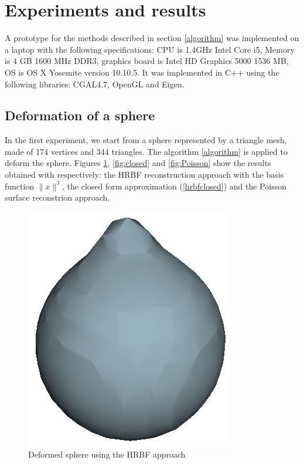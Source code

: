 \documentclass[ams]{U-AizuGT}
\begin{document}
\section{Experiments and results}
A prototype for the methods described in section \ref{algorithm} was implemented on a laptop
with the following specifications: CPU is 1.4GHz Intel Core i5, Memory is 4 GB 1600 MHz DDR3, 
graphics board is Intel HD Graphics 5000 1536 MB, 
OS is OS X Yosemite version 10.10.5. 
It was implemented in C++ using the following libraries: CGAL4.7, OpenGL and Eigen.


\subsection{Deformation of a sphere}

In the first experiment, we start from a sphere represented by a triangle mesh, 
made of 174 vertices and 344 triangles. The algorithm \ref{algorithm} is applied to 
deform the sphere. Figures \ref{fig:hrbf}, \ref{fig:closed} and \ref{fig:Poisson} show 
the results obtained with respectively: the HRBF reconstruction approach with 
the basis function $\|x\|^3$, the closed form approximation (\ref{hrbfclosed}) 
and the Poisson surface reconstrion approach.

\begin{figure}
  \centering\includegraphics[width=0.7\columnwidth]{deformed_sphere_hrbf.jpg}
  \caption{Deformed sphere using the HRBF approach} \label{fig:hrbf}
\end{figure}
 
\end{document}
